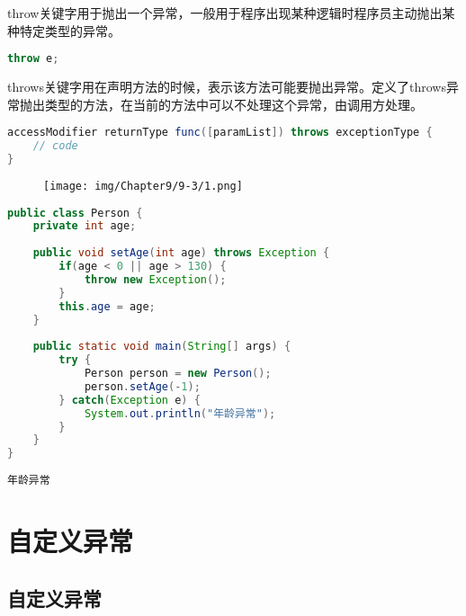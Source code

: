 throw关键字用于抛出一个异常，一般用于程序出现某种逻辑时程序员主动抛出某种特定类型的异常。

\vspace{-0.5cm}

\begin{lstlisting}[language=Java]
throw e;
\end{lstlisting}

throws关键字用在声明方法的时候，表示该方法可能要抛出异常。定义了throws异常抛出类型的方法，在当前的方法中可以不处理这个异常，由调用方处理。

\vspace{-0.5cm}

\begin{lstlisting}[language=Java]
accessModifier returnType func([paramList]) throws exceptionType {
    // code
}
\end{lstlisting}

\begin{figure}[H]
    \centering
    \texttt{[image: img/Chapter9/9-3/1.png]}
\end{figure}


\begin{lstlisting}[language=Java]
public class Person {
    private int age;
    
    public void setAge(int age) throws Exception {
        if(age < 0 || age > 130) {
            throw new Exception();
        }
        this.age = age; 
    }
    
    public static void main(String[] args) {
        try {
            Person person = new Person();
            person.setAge(-1);
        } catch(Exception e) {
            System.out.println("年龄异常");
        }
    }
}
\end{lstlisting}

\begin{tcolorbox}
    \begin{verbatim}
年龄异常
	\end{verbatim}
\end{tcolorbox}

\newpage

\section{自定义异常}

\subsection{自定义异常}

